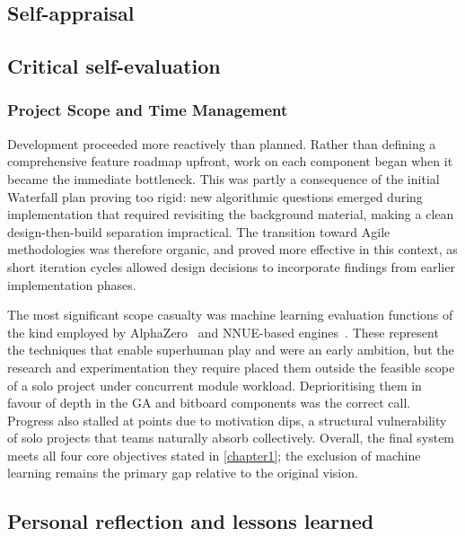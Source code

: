 \begin{appendices}

%
%
\chapter{Self-appraisal}

\section{Critical self-evaluation}

\subsection{Project Scope and Time Management}

Development proceeded more reactively than planned. Rather than defining a comprehensive feature roadmap upfront, work on each component began when it became the immediate bottleneck. This was partly a consequence of the initial Waterfall plan proving too rigid: new algorithmic questions emerged during implementation that required revisiting the background material, making a clean design-then-build separation impractical. The transition toward Agile methodologies was therefore organic, and proved more effective in this context, as short iteration cycles allowed design decisions to incorporate findings from earlier implementation phases.

The most significant scope casualty was machine learning evaluation functions of the kind employed by AlphaZero~\cite{silver2018general} and NNUE-based engines~\cite{nasu2018nnue}. These represent the techniques that enable superhuman play and were an early ambition, but the research and experimentation they require placed them outside the feasible scope of a solo project under concurrent module workload. Deprioritising them in favour of depth in the GA and bitboard components was the correct call. Progress also stalled at points due to motivation dips, a structural vulnerability of solo projects that teams naturally absorb collectively. Overall, the final system meets all four core objectives stated in \cref{chapter1}; the exclusion of machine learning remains the primary gap relative to the original vision.

\section{Personal reflection and lessons learned}


\end{appendices}

